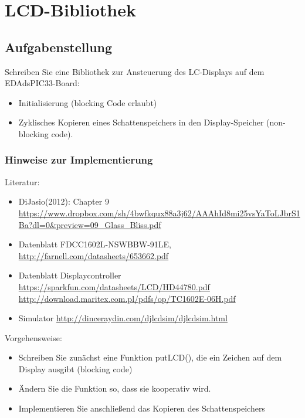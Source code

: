 \section{LCD-Bibliothek}
\subsection{Aufgabenstellung}
Schreiben Sie eine Bibliothek zur Ansteuerung des LC-Displays auf dem EDAdsPIC33-Board:
\begin{itemize}
	\item Initialisierung (blocking Code erlaubt)
	\item Zyklisches Kopieren eines Schattenspeichers in den Display-Speicher\newline
			(non-blocking code).
\end{itemize}

\subsubsection*{Hinweise zur Implementierung}

Literatur:
\begin{itemize}
	\item DiJasio(2012): Chapter 9\newline
			\url{https://www.dropbox.com/sh/4bwfkqux88a3j62/AAAhId8mi25vsYaToLJbrS1Ba?dl=0\&preview=09_Glass_Bliss.pdf}
	\item Datenblatt FDCC1602L-NSWBBW-91LE, \newline \url{http://farnell.com/datasheets/653662.pdf}
	\item Datenblatt Displaycontroller \newline
			\url{https://sparkfun.com/datasheets/LCD/HD44780.pdf}\newline
			\url{http://download.maritex.com.pl/pdfs/op/TC1602E-06H.pdf}
	\item Simulator \newline
	 \url{http://dinceraydin.com/djlcdsim/djlcdsim.html}
	
\end{itemize}

Vorgehensweise:
\begin{itemize}
	\item Schreiben Sie zunächst eine Funktion putLCD(), die ein Zeichen auf dem Display ausgibt (blocking code)
	\item Ändern Sie die Funktion so, dass sie kooperativ wird.
	\item Implementieren Sie anschließend das Kopieren des Schattenspeichers
\end{itemize}

